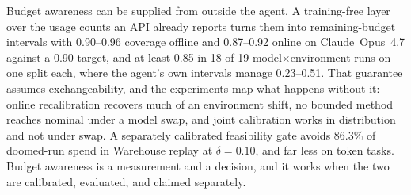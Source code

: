 \documentclass{article}
\begin{document}
Budget awareness can be supplied from outside the agent. A training-free layer over the usage counts an API already reports turns them into remaining-budget intervals with 0.90--0.96 coverage offline and 0.87--0.92 online on Claude~Opus~4.7 against a 0.90 target, and at least 0.85 in 18 of 19 model$\times$environment runs on one split each, where the agent's own intervals manage 0.23--0.51. That guarantee assumes exchangeability, and the experiments map what happens without it: online recalibration recovers much of an environment shift, no bounded method reaches nominal under a model swap, and joint calibration works in distribution and not under swap. A separately calibrated feasibility gate avoids 86.3\% of doomed-run spend in Warehouse replay at $\delta{=}0.10$, and far less on token tasks. Budget awareness is a measurement and a decision, and it works when the two are calibrated, evaluated, and claimed separately.


\begin{ack}
\end{ack}
\end{document}
